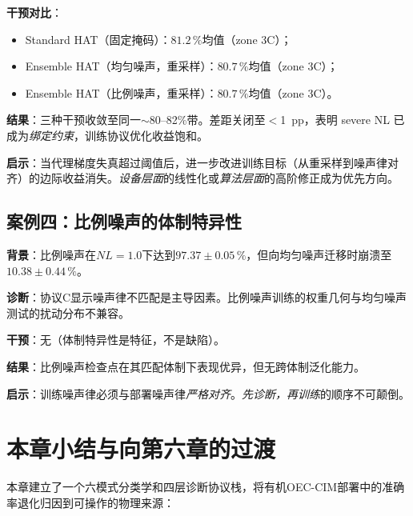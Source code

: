 \textbf{干预对比}：
\begin{itemize}
    \item Standard HAT（固定掩码）：$81.2\,\%$均值（zone 3C）；
    \item Ensemble HAT（均匀噪声，重采样）：$80.7\,\%$均值（zone 3C）；
    \item Ensemble HAT（比例噪声，重采样）：$80.7\,\%$均值（zone 3C）。
\end{itemize}

\textbf{结果}：三种干预收敛至同一$\sim$80--82\%带。差距关闭至$<$1~pp，表明 severe NL 已成为\emph{绑定约束}，训练协议优化收益饱和。

\textbf{启示}：当代理梯度失真超过阈值后，进一步改进训练目标（从重采样到噪声律对齐）的边际收益消失。\emph{设备层面}的线性化或\emph{算法层面}的高阶修正成为优先方向。

\subsection{案例四：比例噪声的体制特异性}
\label{subsec:case_proportional}

\textbf{背景}：比例噪声在$NL=1.0$下达到$97.37\pm0.05\,\%$，但向均匀噪声迁移时崩溃至$10.38\pm0.44\,\%$。

\textbf{诊断}：协议C显示噪声律不匹配是主导因素。比例噪声训练的权重几何与均匀噪声测试的扰动分布不兼容。

\textbf{干预}：无（体制特异性是特征，不是缺陷）。

\textbf{结果}：比例噪声检查点在其匹配体制下表现优异，但无跨体制泛化能力。

\textbf{启示}：训练噪声律必须与部署噪声律\emph{严格对齐}。\emph{先诊断，再训练}的顺序不可颠倒。


\section{本章小结与向第六章的过渡}
\label{sec:ch5_summary}

本章建立了一个六模式分类学和四层诊断协议栈，将有机OEC-CIM部署中的准确率退化归因到可操作的物理来源：

